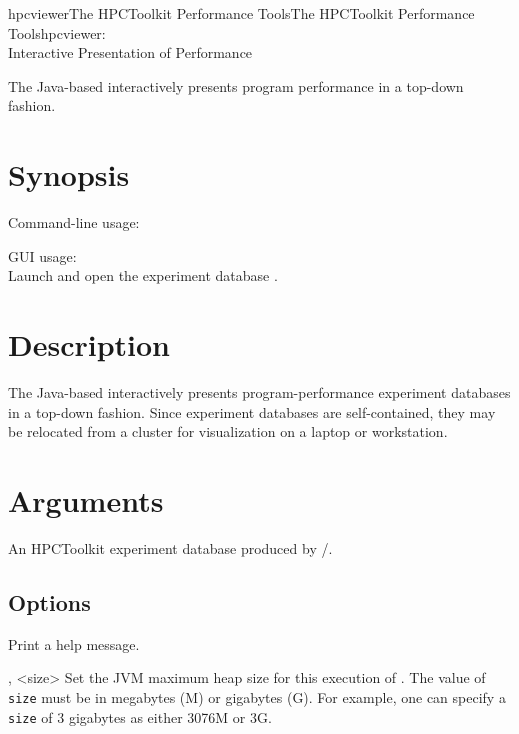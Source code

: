 \documentclass[english]{article}
\begin{document}
\begin{Name}{1}{hpcviewer}{The HPCToolkit Performance Tools}{The HPCToolkit Performance Tools}{hpcviewer:\\ Interactive Presentation of Performance}

The Java-based  interactively presents program performance in a top-down fashion.

\end{Name}

\section{Synopsis}

Command-line usage:\\
\SP\SP\SP{}  

GUI usage:\\
\SP\SP\SP Launch  and open the experiment database .


\section{Description}

The Java-based  interactively presents program-performance experiment databases
in a top-down fashion.
Since experiment databases are self-contained,
they may be relocated from a cluster for visualization on a laptop or workstation.

\section{Arguments}

\begin{Description}
\item[\Arg{hpctoolkit-database}] An HPCToolkit experiment database
produced by /.
\end{Description}


\subsection{Options}

\begin{Description}

\item[\Opt{-h} \Opt{--help}]
Print a help message.


\item[\Opt{-jh}, \Opt{--java-heap} <size>]
        Set the JVM maximum heap size for this execution of  . The value of \texttt{size} must be
        in megabytes (M) or gigabytes (G). For example, one can specify a \texttt{size}  of 3 gigabytes as either
        3076M or 3G.


\end{Description}
\end{document}
